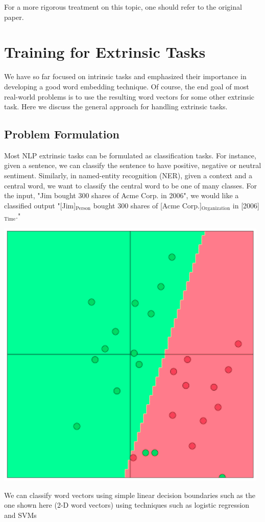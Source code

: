 \documentclass{tufte-handout}
\newcommand{\textunderscript}[1]{$_{\text{#1}}$}
\begin{document}
For a more rigorous treatment on this topic, one should refer to the original paper.

\section{Training for Extrinsic Tasks}

We have so far focused on intrinsic tasks and emphasized their importance in developing a good word embedding technique. Of course, the end goal of most real-world problems is to use the resulting word vectors for some other extrinsic task. Here we discuss the general approach for handling extrinsic tasks.

\subsection{Problem Formulation}
Most NLP extrinsic tasks can be formulated as classification tasks. For instance, given a sentence, we can classify the sentence to have positive, negative or neutral sentiment. Similarly, in named-entity recognition (NER), given a context and a central word, we want to classify the central word to be one of many classes. For the input, "Jim bought 300 shares of Acme Corp. in 2006", we would like a classified output "[Jim]\textunderscript{Person} bought 300 shares of [Acme Corp.]\textunderscript{Organization} in [2006]\textunderscript{Time}."

\begin{marginfigure}%
  \includegraphics[width = \linewidth]{LinearBoundary}
  \caption{We can classify word vectors using simple linear decision boundaries such as the one shown here (2-D word vectors) using techniques such as logistic regression and SVMs}
  \label{fig:LinearBoundary}
\end{marginfigure}
\end{document}
